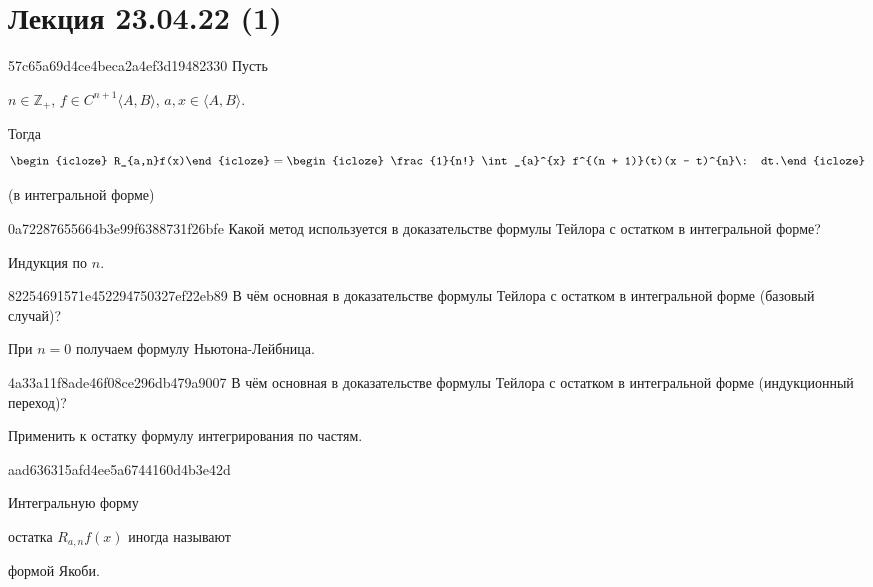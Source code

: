 \section{Лекция 23.04.22 (1)}
\begin{note}{57c65a69d4ce4beca2a4ef3d19482330}
    Пусть \begin{icloze}{3}\({ n \in \mathbb Z_+ }\),   \({ f \in C^{n + 1}\langle A, B \rangle }\), \({ a, x \in \langle A, B \rangle }\).\end{icloze}
    Тогда
    \[
        \begin{icloze}{2}R_{a,n}f(x)\end{icloze} = \begin{icloze}{1}\frac{1}{n!} \int_{a}^{x} f^{(n + 1)}(t)(x - t)^{n}\: dt.\end{icloze}
    \]

    \begin{center}
        \tiny
        (в интегральной форме)
    \end{center}
\end{note}

\begin{note}{0a72287655664b3e99f6388731f26bfe}
    Какой метод используется в доказательстве формулы Тейлора с остатком в интегральной форме?

    \begin{cloze}{1}
        Индукция по \({ n }\).
    \end{cloze}
\end{note}

\begin{note}{82254691571e452294750327ef22eb89}
    В чём основная в доказательстве формулы Тейлора с остатком в интегральной форме (базовый случай)?

    \begin{cloze}{1}
        При \({ n = 0 }\) получаем формулу Ньютона-Лейбница.
    \end{cloze}
\end{note}

\begin{note}{4a33a11f8ade46f08ce296db479a9007}
    В чём основная в доказательстве формулы Тейлора с остатком в интегральной форме (индукционный переход)?

    \begin{cloze}{1}
        Применить к остатку формулу интегрирования по частям.
    \end{cloze}
\end{note}

\begin{note}{aad636315afd4ee5a6744160d4b3e42d}
    \begin{icloze}{2}Интегральную форму\end{icloze} остатка \({ R_{a,n}f(x) }\) иногда называют \begin{icloze}{1}формой Якоби.\end{icloze}
\end{note}

